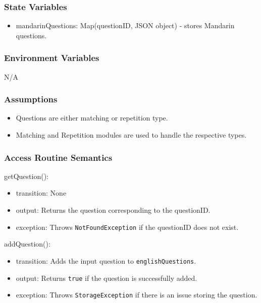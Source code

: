 \documentclass[12pt, titlepage]{article}
\begin{document}
\subsubsection{State Variables}

\begin{itemize}
  \item mandarinQuestions: Map(questionID, JSON object) - stores Mandarin questions.
\end{itemize}

\subsubsection{Environment Variables}

N/A

\subsubsection{Assumptions}

\begin{itemize}
  \item Questions are either matching or repetition type.
  \item Matching and Repetition modules are used to handle the respective types.
\end{itemize}

\subsubsection{Access Routine Semantics}

\noindent getQuestion():
\begin{itemize}
\item transition: None
\item output: Returns the question corresponding to the questionID.
\item exception: Throws \texttt{NotFoundException} if the questionID does not exist.
\end{itemize}

\noindent addQuestion():
\begin{itemize}
\item transition: Adds the input question to \texttt{englishQuestions}.
\item output: Returns \texttt{true} if the question is successfully added.
\item exception: Throws \texttt{StorageException} if there is an issue storing the question.
\end{itemize}
\end{document}
